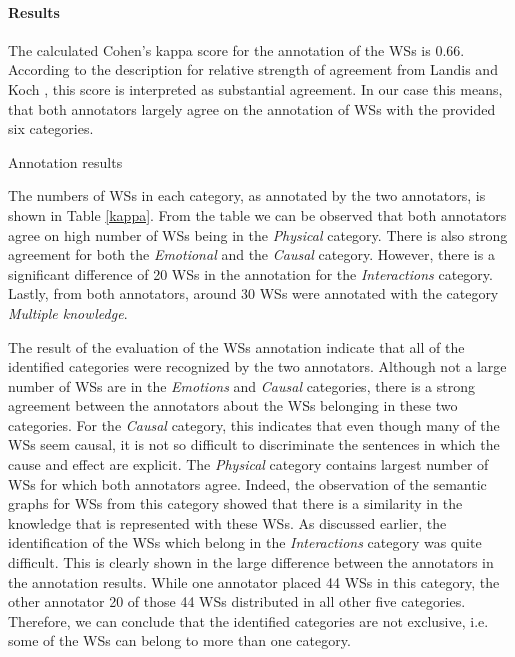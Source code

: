 \paragraph{Results}
The calculated Cohen's kappa score for the annotation of the WSs is 0.66. According to the description for relative strength of agreement from Landis and Koch \cite{articleM}, this score is interpreted as substantial agreement. In our case this means, that both annotators largely agree on the annotation of WSs with the provided six categories.

\begin{table}
	\centering
	
	\caption{{\label{kappa}}Annotation results}
\end{table}

The numbers of WSs in each category, as annotated by the two annotators, is shown in Table \ref{kappa}.  
From the table we can be observed that both annotators agree on high number of WSs being in the \textit{Physical} category.
There is also strong agreement for both the \textit{Emotional} and the \textit{Causal} category. 
However, there is a significant difference of 20 WSs in the annotation for the \textit{Interactions} category. Lastly, from both annotators, around 30 WSs were annotated with the category \textit{Multiple knowledge}. 

The result of the evaluation of the WSs annotation indicate that all of the identified categories were recognized by the two annotators. Although not a large number of WSs are in the \textit{Emotions} and \textit{Causal} categories, there is a strong agreement between the annotators about the WSs belonging in these two categories. For the \textit{Causal} category, this indicates that even though many of the WSs seem causal, it is not so difficult to discriminate the sentences in which the cause and effect are explicit. The \textit{Physical} category contains largest number of WSs for which both annotators agree. Indeed, the observation of the semantic graphs for WSs from this category showed that there is a similarity in the knowledge that is represented with these WSs. As discussed earlier, the identification of the WSs which belong in the \textit{Interactions} category was quite difficult. This is clearly shown in the large difference between the annotators in the annotation results. While one annotator placed 44 WSs in this category, the other annotator 20 of those 44 WSs distributed in all other five categories. Therefore, we can conclude that the identified categories are not exclusive, i.e. some of the WSs can belong to more than one category. 



